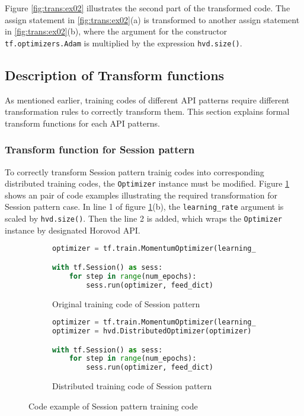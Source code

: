 Figure \ref{fig:trans:ex02} illustrates the second part of the transformed code.
The assign statement in \ref{fig:trans:ex02}(a) is transformed to
another assign statement in \ref{fig:trans:ex02}(b), where the argument for the
constructor {\tt tf.optimizers.Adam} is multiplied by the expression
{\tt hvd.size()}. 

\subsection{Description of Transform functions}

As mentioned earlier, training codes of different API patterns
require different transformation rules to correctly transform them.
This section explains formal transform functions for each API patterns.

\subsubsection{Transform function for Session pattern}

To correctly transform Session pattern trainig codes into corresponding
distributed training codes, the {\tt Optimizer} instance must be modified.
Figure \ref{fig:trans:sessiontrans} shows an pair of code examples
illustrating the required transformation for Session pattern case.
In line 1 of figure \ref{fig:trans:sessiontrans}(b),
the {\tt learning\_rate} argument is scaled by {\tt hvd.size()}.
Then the line 2 is added, which wraps the {\tt Optimizer} instance
by designated Horovod API.

\begin{figure}[ht!]
  \begin{subfigure}[t]{0.45\textwidth}
    \begin{lstlisting}[language=Python]
optimizer = tf.train.MomentumOptimizer(learning_rate = 0.01)

with tf.Session() as sess:
    for step in range(num_epochs): 
        sess.run(optimizer, feed_dict)
    \end{lstlisting}
    \caption{Original training code of Session pattern}
  \end{subfigure}
  \hspace{5mm}
  \begin{subfigure}[t]{0.45\textwidth}
    \begin{lstlisting}[language=Python]
optimizer = tf.train.MomentumOptimizer(learning_rate = 0.01 * hvd.size())
optimizer = hvd.DistributedOptimizer(optimizer)

with tf.Session() as sess:
    for step in range(num_epochs): 
        sess.run(optimizer, feed_dict)
    \end{lstlisting}
    \caption{Distributed training code of Session pattern}
  \end{subfigure}
  \caption{Code example of Session pattern training code}
  \label{fig:trans:sessiontrans}
\end{figure}


